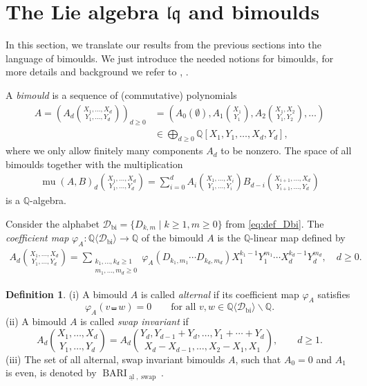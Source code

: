 \documentclass[12pt,reqno]{amsart}
\numberwithin{equation}{section}
\theoremstyle{definition}
\newtheorem{defi}[thm]{Definition}
\newcommand{\QQ}{\mathbb{Q}}
\newcommand{\BARI}{\operatorname{BARI}_{\underline{\operatorname{al}},\operatorname{swap}}}
\newcommand{\Dbi}{\mathcal{D}_{\operatorname{bi}}}
\newcommand{\QDbi}{\QQ\langle \Dbi\rangle}
\newcommand{\lqq}{\mathfrak{lq}}
\begin{document}
\section{The Lie algebra $\lqq$ and bimoulds} \label{sec:bimoulds}

In this section, we translate our results from the previous sections into the language of bimoulds. We just introduce the needed notions for bimoulds, for more details and background we refer to \cite{Ec11}, \cite{Sc15}.

\vspace{0.3cm} 
A \textit{bimould} is a sequence of (commutative) polynomials
\begin{align*} A=\left(A_d\binom{X_1,\ldots,X_d}{Y_1,\ldots,Y_d}\right)_{d\geq0}&=\left(A_0(\emptyset),A_1\binom{X_1}{Y_1},A_2\binom{X_1,X_2}{Y_1,Y_2},\ldots\right)\\
&\in\bigoplus_{d\geq0}\QQ[X_1,Y_1,\ldots,X_d,Y_d],
\end{align*}
where we only allow finitely many components $A_d$ to be nonzero. The space of all bimoulds together with the multiplication
\begin{align*}
\operatorname{mu}(A,B)_d\binom{X_1,\ldots,X_d}{Y_1,\ldots,Y_d}=\sum_{i=0}^d A_i\binom{X_1,\ldots,X_i}{Y_1,\ldots,Y_i}B_{d-i}\binom{X_{i+1},\ldots,X_d}{Y_{i+1},\ldots,Y_d}
\end{align*}
is a $\QQ$-algebra.


Consider the alphabet $\Dbi=\{D_{k,m}\mid k\geq 1, m\geq0\}$ from \eqref{eq:def_Dbi}. The \textit{coefficient map} $\varphi_A:\QDbi\to \QQ$ of the bimould $A$ is the $\QQ$-linear map defined by
\begin{align*}	A_d\binom{X_1,\ldots,X_d}{Y_1,\ldots,Y_d}=\sum_{\substack{k_1,\ldots,k_d\geq1 \\ m_1,\ldots,m_d\geq0}} \varphi_A(D_{k_1,m_1}\cdots D_{k_d,m_d})X_1^{k_1-1}Y_1^{m_1}\cdots X_d^{k_d-1}Y_d^{m_d}, \quad d\geq0.
\end{align*}

\begin{defi} (i) A bimould $A$ is called \emph{alternal} if its coefficient map $\varphi_A$ satisfies
\[\varphi_A(v\shuffle w)=0 \qquad \text{for all } v,w \in \QDbi\backslash \QQ.\]
(ii) A bimould $A$ is called \emph{swap invariant} if
\[A_d\binom{X_1,\ldots,X_d}{Y_1,\ldots,Y_d}=A_d\binom{Y_d,Y_{d-1}+Y_d,\ldots,Y_1+\cdots+Y_d}{X_d-X_{d-1},\ldots,X_2-X_1,X_1}, \qquad d\geq1.\]
(iii) The set of all alternal, swap invariant bimoulds $A$, such that $A_0=0$ and $A_1$ is even, is denoted by $\BARI$.
\end{defi}
\end{document}
